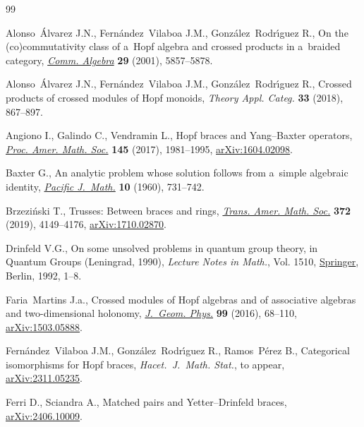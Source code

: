 \documentclass[pdftex]{sigma}
\numberwithin{equation}{section}
\begin{document}
\begin{thebibliography}{99}
\footnotesize\itemsep=0pt

Alonso~\'Alvarez J.N., Fern\'andez~Vilaboa J.M., Gonz\'alez~Rodr\'{\i}guez R.,
 On the (co)commutativity class of a~{H}opf algebra and crossed products in
 a~braided category, \href{https://doi.org/10.1081/AGB-100107962}{\textit{Comm. Algebra}} \textbf{29} (2001), 5857--5878.

Alonso~\'Alvarez J.N., Fern\'andez~Vilaboa J.M., Gonz\'alez~Rodr\'{\i}guez R.,
 Crossed products of crossed modules of {H}opf monoids, \textit{Theory Appl.
 Categ.} \textbf{33} (2018), 867--897.

Angiono I., Galindo C., Vendramin L., Hopf braces and {Y}ang--{B}axter
 operators, \href{https://doi.org/10.1090/proc/13395}{\textit{Proc. Amer. Math. Soc.}} \textbf{145} (2017), 1981--1995,
 \href{https://arxiv.org/abs/1604.02098}{arXiv:1604.02098}.

Baxter G., An analytic problem whose solution follows from a~simple algebraic
 identity, \href{https://doi.org/10.2140/pjm.1960.10.731}{\textit{Pacific J.~Math.}} \textbf{10} (1960), 731--742.

Brzezi\'nski T., Trusses: {B}etween braces and rings, \href{https://doi.org/10.1090/tran/7705}{\textit{Trans. Amer.
 Math. Soc.}} \textbf{372} (2019), 4149--4176, \href{https://arxiv.org/abs/1710.02870}{arXiv:1710.02870}.

Drinfeld V.G., On some unsolved problems in quantum group theory, in Quantum
 Groups ({L}eningrad, 1990), \textit{Lecture Notes in Math.}, Vol. 1510,
 \href{https://doi.org/10.1007/BFb0101175}{Springer}, Berlin, 1992, 1--8.

Faria~Martins J.a., Crossed modules of {H}opf algebras and of associative
 algebras and two-dimensional holonomy, \href{https://doi.org/10.1016/j.geomphys.2015.09.012}{\textit{J.~Geom. Phys.}} \textbf{99}
 (2016), 68--110, \href{https://arxiv.org/abs/1503.05888}{arXiv:1503.05888}.

Fern\'andez~Vilaboa J.M., Gonz\'alez~Rodr\'{\i}guez R., Ramos~P\'erez B.,
 Categorical isomorphisms for Hopf braces, \textit{Hacet.~J.~Math. Stat.}, {t}o
 appear, \href{https://arxiv.org/abs/2311.05235}{arXiv:2311.05235}.

Ferri D., Sciandra A., Matched pairs and {Y}etter--{D}rinfeld braces,
 \href{https://arxiv.org/abs/2406.10009}{arXiv:2406.10009}.


\end{thebibliography}
\end{document}
